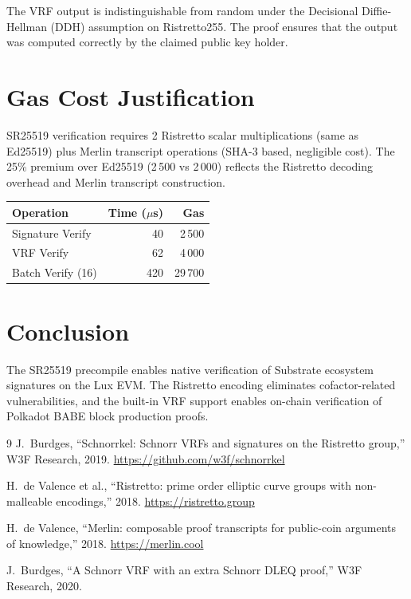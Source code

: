 \documentclass[11pt,a4paper]{article}
\begin{document}
The VRF output is indistinguishable from random under the Decisional
Diffie-Hellman (DDH) assumption on Ristretto255. The proof ensures that the
output was computed correctly by the claimed public key holder.

\section{Gas Cost Justification}

SR25519 verification requires 2 Ristretto scalar multiplications (same as Ed25519)
plus Merlin transcript operations (SHA-3 based, negligible cost). The 25\% premium
over Ed25519 (2\,500 vs 2\,000) reflects the Ristretto decoding overhead and
Merlin transcript construction.

\begin{table}[H]
\centering
\begin{tabular}{lrr}
\toprule
\textbf{Operation} & \textbf{Time ($\mu$s)} & \textbf{Gas} \\
\midrule
Signature Verify & 40 & 2\,500 \\
VRF Verify & 62 & 4\,000 \\
Batch Verify (16) & 420 & 29\,700 \\
\bottomrule
\end{tabular}
\end{table}

\section{Conclusion}

The SR25519 precompile enables native verification of Substrate ecosystem
signatures on the Lux EVM. The Ristretto encoding eliminates cofactor-related
vulnerabilities, and the built-in VRF support enables on-chain verification
of Polkadot BABE block production proofs.

\begin{thebibliography}{9}
  J.~Burdges, ``Schnorrkel: Schnorr VRFs and signatures on the Ristretto group,''
  W3F Research, 2019. \url{https://github.com/w3f/schnorrkel}

  H.~de Valence et al., ``Ristretto: prime order elliptic curve groups with
  non-malleable encodings,'' 2018. \url{https://ristretto.group}

  H.~de Valence, ``Merlin: composable proof transcripts for public-coin
  arguments of knowledge,'' 2018. \url{https://merlin.cool}

  J.~Burdges, ``A Schnorr VRF with an extra Schnorr DLEQ proof,''
  W3F Research, 2020.
\end{thebibliography}
\end{document}
